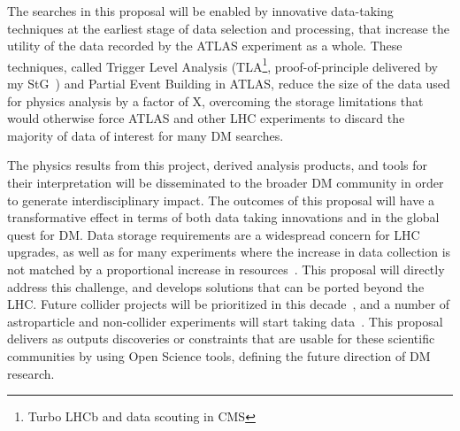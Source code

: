 \documentclass[11pt,a4paper]{article}
\begin{document}
The searches in this proposal will be enabled by innovative data-taking techniques at the earliest stage of data selection and processing, that increase the utility of the data recorded by the ATLAS experiment as a whole. These techniques, called Trigger Level Analysis (TLA\footnote{Turbo LHCb and data scouting in CMS}, proof-of-principle delivered by my StG~\cite{PRL}) and Partial Event Building in ATLAS, reduce the size of the data used for physics analysis by a factor of \color{red}X\color{black}, overcoming the storage limitations that would otherwise force ATLAS and other LHC experiments to discard the majority of data of interest for many DM searches. %

The physics results from this project, derived analysis products, and tools for their interpretation will be disseminated to the broader DM community in order to generate interdisciplinary impact.
The outcomes of this proposal will have a transformative effect in terms of both data taking innovations and in the global quest for DM. 
Data storage requirements are a widespread concern for LHC upgrades, as well as for many experiments where the increase in data collection is not matched by a proportional increase in resources~\cite{HSF}. 
This proposal will directly address this challenge, and develops solutions that can be ported beyond the LHC. 
Future collider projects will be prioritized in this decade~\cite{EuropeanStrategy}, and a number of astroparticle and non-collider experiments will start taking data~\cite{Astro2020}. 
This proposal delivers as outputs discoveries or constraints that are usable for these scientific communities by using Open Science tools, defining the future direction of DM research. 
\end{document}

